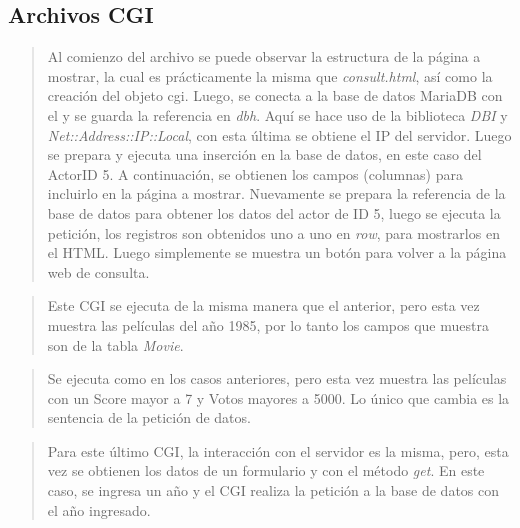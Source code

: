\documentclass{article}
\begin{document}
  \subsection{Archivos CGI}

  

  \begin{quote}
  Al comienzo del archivo se puede observar la estructura de la página a mostrar, la cual es prácticamente la misma que \textit{consult.html}, así como la creación del objeto cgi. Luego, se conecta a la base de datos MariaDB con el y se guarda la referencia en \textit{dbh}. Aquí se hace uso de la biblioteca  \textit{DBI} y \textit{Net::Address::IP::Local}, con esta última se obtiene el IP del servidor.
  Luego se prepara y ejecuta una inserción en la base de datos, en este caso del ActorID 5. A continuación, se obtienen los campos (columnas) para incluirlo en la página a mostrar. 
  Nuevamente se prepara la referencia de la base de datos para obtener los datos del actor de ID 5, luego se ejecuta la petición, los registros son obtenidos uno a uno en \textit{row}, para mostrarlos en el HTML.
  Luego simplemente se muestra un botón para volver a la página web de consulta.
  \end{quote}

  

  \begin{quote}
    Este CGI se ejecuta de la misma manera que el anterior, pero esta vez muestra las películas del año 1985, por lo tanto los campos que muestra son de la tabla \textit{Movie}.
  \end{quote}

  

  \begin{quote}
    Se ejecuta como en los casos anteriores, pero esta vez muestra las películas con un Score mayor a 7 y Votos mayores a 5000. Lo único que cambia es la sentencia de la petición de datos.
  \end{quote}

  

  \begin{quote}
    Para este último CGI, la interacción con el servidor es la misma, pero, esta vez se obtienen los datos de un formulario y con el método \textit{get}. En este caso, se ingresa un año y el CGI realiza la petición a la base de datos con el año ingresado.
  \end{quote}
\end{document}
